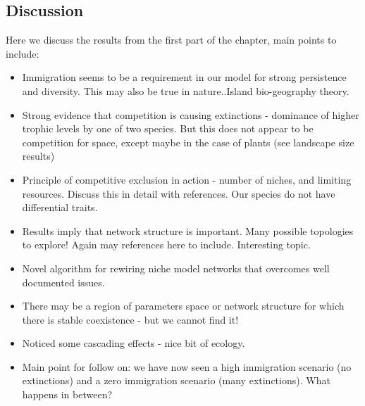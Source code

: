 \subsection{Discussion}
\label{sec:disucss_persitence}

Here we discuss the results from the first part of the chapter, main points to include:
\begin{itemize}
	\item Immigration seems to be a requirement in our model for strong persistence and diversity. This may also be true in nature..Island bio-geography theory.
	\item Strong evidence that competition is causing extinctions - dominance of higher trophic levels by one of two species. But this does not appear to be competition for space, except maybe in the case of plants (see landscape size results)
	\item Principle of competitive exclusion in action - number of niches, and limiting resources. Discuss this in detail with references. Our species do not have differential traits.
	\item Results imply that network structure is important. Many possible topologies to explore! Again may references here to include. Interesting topic.
	\item Novel algorithm for rewiring niche model networks that overcomes well documented issues.
	\item There may be a region of parameters space or network structure for which there is stable coexistence - but we cannot find it!
	\item Noticed some cascading effects - nice bit of ecology.
	\item Main point for follow on: we have now seen a high immigration scenario (no extinctions) and a zero immigration scenario (many extinctions). What happens in between?
\end{itemize}

